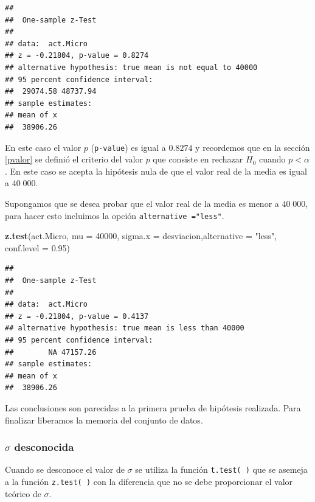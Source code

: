 \documentclass[letterpaper,]{book}
\newenvironment{Shaded}{\begin{snugshade}}{\end{snugshade}}
\newcommand{\DataTypeTok}[1]{\textcolor[rgb]{0.13,0.29,0.53}{#1}}
\newcommand{\DecValTok}[1]{\textcolor[rgb]{0.00,0.00,0.81}{#1}}
\newcommand{\FloatTok}[1]{\textcolor[rgb]{0.00,0.00,0.81}{#1}}
\newcommand{\KeywordTok}[1]{\textcolor[rgb]{0.13,0.29,0.53}{\textbf{#1}}}
\newcommand{\NormalTok}[1]{#1}
\newcommand{\StringTok}[1]{\textcolor[rgb]{0.31,0.60,0.02}{#1}}
\begin{document}
\begin{verbatim}
## 
##  One-sample z-Test
## 
## data:  act.Micro
## z = -0.21804, p-value = 0.8274
## alternative hypothesis: true mean is not equal to 40000
## 95 percent confidence interval:
##  29074.58 48737.94
## sample estimates:
## mean of x 
##  38906.26
\end{verbatim}

En este caso el valor \(p\) (\texttt{p-value}) es igual a \(0.8274\) y recordemos que en la sección \ref{pvalor} se definió el criterio del valor \(p\) que consiste en rechazar \(H_0\) cuando \(p < \alpha\). En este caso se acepta la hipótesis nula de que el valor real de la media es igual a \(40\;000\).

Supongamos que se desea probar que el valor real de la media es menor a \(40\;000\), para hacer esto incluimos la opción \texttt{alternative\ ="less"}.

\begin{Shaded}
\begin{Highlighting}[]
\KeywordTok{z.test}\NormalTok{(act.Micro, }\DataTypeTok{mu =} \DecValTok{40000}\NormalTok{, }\DataTypeTok{sigma.x =}\NormalTok{ desviacion,}\DataTypeTok{alternative =} \StringTok{"less"}\NormalTok{,  }\DataTypeTok{conf.level =} \FloatTok{0.95}\NormalTok{)}
\end{Highlighting}
\end{Shaded}

\begin{verbatim}
## 
##  One-sample z-Test
## 
## data:  act.Micro
## z = -0.21804, p-value = 0.4137
## alternative hypothesis: true mean is less than 40000
## 95 percent confidence interval:
##        NA 47157.26
## sample estimates:
## mean of x 
##  38906.26
\end{verbatim}

Las conclusiones son parecidas a la primera prueba de hipótesis realizada. Para finalizar liberamos la memoria del conjunto de datos.

\hypertarget{sigma-desconocida}{%
\subsubsection{\texorpdfstring{\(\sigma\) desconocida}{\textbackslash{}sigma desconocida}}\label{sigma-desconocida}}

Cuando se desconoce el valor de \(\sigma\) se utiliza la función \texttt{t.test(\ )} que se asemeja a la función \texttt{z.test(\ )} con la diferencia que no se debe proporcionar el valor teórico de \(\sigma\).
\end{document}
